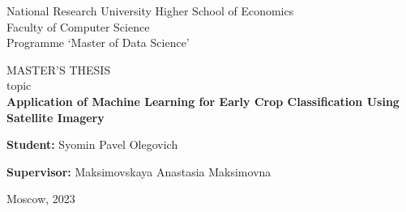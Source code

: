 \begin{titlepage}

    \begin{center}
        \large
        National Research University Higher School of Economics\\
        Faculty of Computer Science\\
        Programme ‘Master of Data Science’

        \vspace{2cm}
        MASTER'S THESIS\\
        topic\\
        \Huge
        \textbf{Application of Machine Learning for Early Crop Classification Using Satellite Imagery}
    \end{center}
    
    \vspace{1cm}
    \Large
    \textbf{Student:} Syomin Pavel Olegovich

    \vspace{2cm}
    \Large
    \textbf{Supervisor:} Maksimovskaya Anastasia Maksimovna
    
    \vfill

    \begin{center}
        \large
        Moscow, 2023
    \end{center}      
    
\end{titlepage}